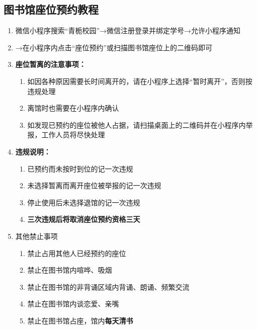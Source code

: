 \subsection[图书馆座位预约教程]{图书馆座位预约教程}
\label{library_book}
\begin{enumerate}
    \item 微信小程序搜索“青栀校园”→微信注册登录并绑定学号→允许小程序通知
    \item →在小程序内点击“座位预约”或扫描图书馆座位上的二维码即可
    \item \textbf{座位暂离的注意事项：}
          \begin{enumerate}
              \item 如因各种原因需要长时间离开的，请在小程序上选择“暂时离开”，否则按违规处理
              \item 离馆时也需要在小程序内确认
              \item 如发现已预约的座位被他人占据，请扫描桌面上的二维码并在小程序内举报，工作人员将尽快处理
          \end{enumerate}
    \item \textbf{违规说明：}
          \begin{enumerate}
              \item 已预约而未按时到位的记一次违规
              \item 未选择暂离而离开座位被举报的记一次违规
              \item 停止使用后未选择退馆的记一次违规
              \item \textbf{三次违规后将取消座位预约资格三天}
          \end{enumerate}
    \item 其他禁止事项
          \begin{enumerate}
              \item 禁止占用其他人已经预约的座位
              \item 禁止在图书馆内喧哗、吸烟
              \item 禁止在图书馆的非背诵区域内背诵、朗诵、频繁交流
              \item 禁止在图书馆内谈恋爱、亲嘴
              \item 禁止在图书馆占座，馆内\textbf{每天清书}
          \end{enumerate}
\end{enumerate}

